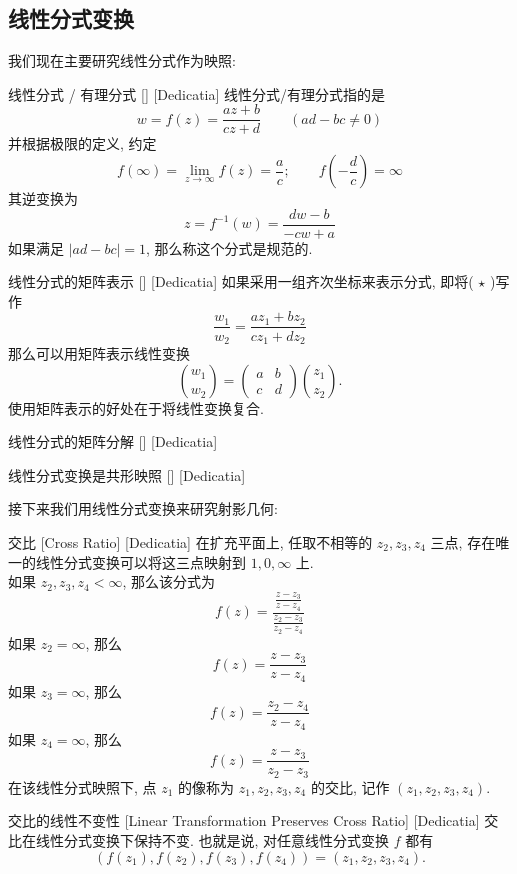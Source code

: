 \documentclass[UTF8]{ctexart}
\begin{document}
\subsection{线性分式变换}
我们现在主要研究线性分式作为映照: 
\begin{dfn}
    [UUID]
    {线性分式 / 有理分式}
    []
    [Dedicatia]
    线性分式/有理分式指的是
    \[w=f(z)=\frac{az+b}{cz+d}\qquad(ad-bc\neq 0)\tag{ \( \star \) }\]
    并根据极限的定义, 约定
    \[f(\infty)=\lim_{z\to\infty}f(z)=\dfrac{a}{c};\qquad f\left(-\dfrac{d}{c}\right)=\infty\]
    其逆变换为
    \[z=f^{-1}(w)=\frac{dw-b}{-cw+a}\]
    如果满足 \( |ad-bc|=1 \), 那么称这个分式是规范的. 
\end{dfn}
\begin{ppt}
    [UUID]
    {线性分式的矩阵表示}
    []
    [Dedicatia]
    如果采用一组齐次坐标来表示分式, 即将( \( \star \) )写作
    \[\frac{w_1}{w_2}=\frac{az_1+bz_2}{cz_1+dz_2}\]
    那么可以用矩阵表示线性变换
    \[\binom{w_1}{w_2}=\begin{pmatrix}
        a&b\\c&d
    \end{pmatrix}\binom{z_1}{z_2}.\]
    使用矩阵表示的好处在于将线性变换复合. 
\end{ppt}
\begin{ppt}
    [UUID]
    {线性分式的矩阵分解}
    []
    [Dedicatia]
\end{ppt}
\begin{ppt}
    [UUID]
    {线性分式变换是共形映照}
    []
    [Dedicatia]
\end{ppt}
接下来我们用线性分式变换来研究射影几何: 
\begin{dfn}
    [UUID]
    {交比}
    [Cross Ratio]
    [Dedicatia]
    在扩充平面上, 任取不相等的 \( z_2,z_3,z_4 \) 三点, 存在唯一的线性分式变换可以将这三点映射到 \( 1,0,\infty \) 上. \\
    如果 \( z_2,z_3,z_4<\infty \), 那么该分式为
    \[f(z)=\frac{\frac{z-z_3}{z-z_4}}{\frac{z_2-z_3}{z_2-z_4}}\]
    如果 \( z_2=\infty \), 那么
    \[f(z)=\frac{z-z_3}{z-z_4}\]
    如果 \( z_3=\infty \), 那么
    \[f(z)=\frac{z_2-z_4}{z-z_4}\]
    如果 \( z_4=\infty \), 那么
    \[f(z)=\frac{z-z_3}{z_2-z_3}\]
    在该线性分式映照下, 点 \( z_1 \) 的像称为 \( z_1,z_2,z_3,z_4 \) 的交比, 记作 \( (z_1,z_2,z_3,z_4) \).
\end{dfn}
\begin{ppt}
    [UUID]
    {交比的线性不变性}
    [Linear Transformation Preserves Cross Ratio]
    [Dedicatia]
    交比在线性分式变换下保持不变. 也就是说, 对任意线性分式变换 \( f \) 都有
    \[(f(z_1),f(z_2),f(z_3),f(z_4))=(z_1,z_2,z_3,z_4).\]
\end{ppt}
\end{document}

